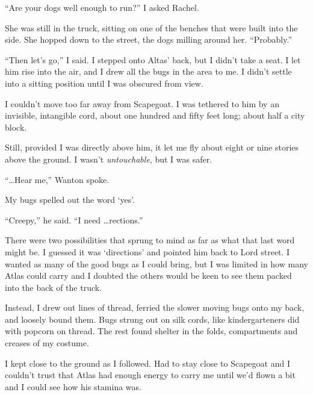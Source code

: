 ``Are your dogs well enough to run?''  I asked Rachel.



She was still in the truck, sitting on one of the benches that were built into the side.  She hopped down to the street, the dogs milling around her.  ``Probably.''



``Then let's go,'' I said.  I stepped onto Altas' back, but I didn't take a seat.  I let him rise into the air, and I drew all the bugs in the area to me.  I didn't settle into a sitting position until I was obscured from view.



I couldn't move too far away from Scapegoat.  I was tethered to him by an invisible, intangible cord, about one hundred and fifty feet long; about half a city block.



Still, provided I was directly above him, it let me fly about eight or nine stories above the ground.  I wasn't \emph{untouchable}, but I was safer.



``\ldots{}Hear me,'' Wanton spoke.



My bugs spelled out the word `yes'.



``Creepy,'' he said.  ``I need \ldots{}rections.''



There were two possibilities that sprung to mind as far as what that last word might be.  I guessed it was `directions' and pointed him back to Lord street.  I wanted as many of the good bugs as I could bring, but I was limited in how many Atlas could carry and I doubted the others would be keen to see them packed into the back of the truck.



Instead, I drew out lines of thread, ferried the slower moving bugs onto my back, and loosely bound them.  Bugs strung out on silk cords, like kindergarteners did with popcorn on thread.  The rest found shelter in the folds, compartments and creases of my costume.



I kept close to the ground as I followed.  Had to stay close to Scapegoat and I couldn't trust that Atlas had enough energy to carry me until we'd flown a bit and I could see how his stamina was.



